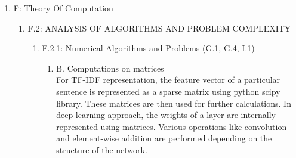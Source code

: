 \documentclass[oneside,a4paper,12pt]{book}
\begin{document}
\begin{enumerate}
	\item[] F: Theory Of Computation 
	\begin{enumerate}
		\item[] F.2: ANALYSIS OF ALGORITHMS AND PROBLEM COMPLEXITY 
		\begin{enumerate}
			\item[] F.2.1: Numerical Algorithms and Problems (G.1, G.4, I.1) 
			\begin{enumerate}
				\item[]  B. Computations on matrices \\
						For TF-IDF representation, the feature vector of a particular sentence is represented as a sparse matrix using python scipy library. These matrices are then used for further calculations. In deep learning approach, the weights of a layer are internally represented using matrices. Various operations like convolution and element-wise addition are performed depending on the structure of the network. 
			\end{enumerate}
		\end{enumerate}
		

\end{enumerate}
\end{enumerate}
\end{document}
